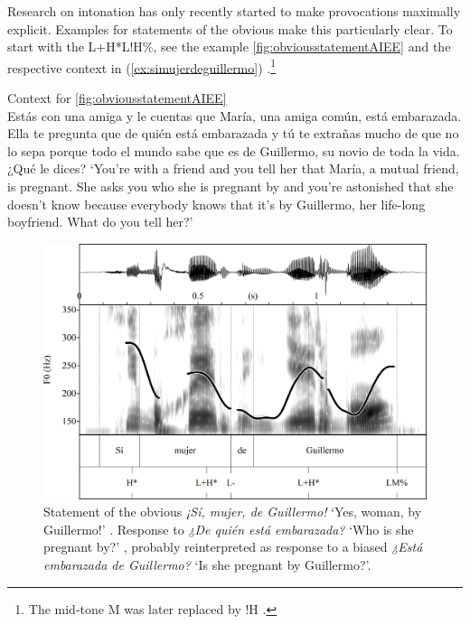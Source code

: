 Research on intonation has only recently started to make provocations maximally explicit. Examples for statements of the obvious make this particularly clear. To start with the L+H*L!H\%, see the example \autoref{fig:obviousstatementAIEE} and the respective context in (\ref{ex:simujerdeguillermo}) \citep{PrietoRoseano2009encuestacastilia}.\footnote{The mid-tone M was later replaced by !H \citep[362]{HualdePrieto2015}.}

\begin{exe}
	\ex\label{ex:simujerdeguillermo} Context for \autoref{fig:obviousstatementAIEE} \\
	Estás con una amiga y le cuentas que María, una amiga común, está embarazada. Ella te pregunta que de quién está embarazada y tú te extrañas mucho de que no lo sepa porque todo el mundo sabe que es de Guillermo, su novio de toda la vida. ¿Qué le dices? 
	\glt ‘You're with a friend and you tell her that María, a mutual friend, is pregnant. She asks you who she is pregnant by and you're astonished that she doesn't know because everybody knows that it's by Guillermo, her life-long boyfriend. What do you tell her?’ 
\end{exe}



\begin{figure}
\includegraphics[width=.95\linewidth]{gfx/figure_statement_of_the_ovbious_AIEE_new_2.png}
\caption[Obvious declarative \textit{¡Sí, mujer, de Guillermo!}]{Statement of the 
	obvious \textit{¡Sí, mujer, de Guillermo!} `Yes, woman, by Guillermo!' 
	\citep{Prieto2009-2013}. Response to \textit{¿De quién está embarazada?} 
	`Who is she pregnant by?' \citep{PrietoRoseano2009encuestacastilia}, 
	probably reinterpreted as response to a biased \textit{¿Está embarazada de 
		Guillermo?} `Is she pregnant by 
	Guillermo?'.  \href{http://prosodia.upf.edu/atlasentonacion/enquestes/espanol/madrid/frases/mp3/10.mp3}{\faVolumeUp} \href{http://prosodia.upf.edu/atlasentonacion/enquestes/espanol/madrid/index.html}{\faExternalLink*}} \label{fig:obviousstatementAIEE}
\bigskip
\end{figure}

